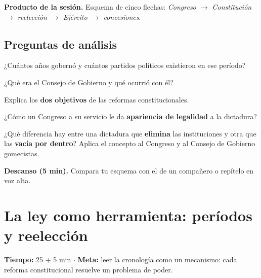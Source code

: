 \documentclass[12pt, letterpaper]{article}
\makeatletter
\let\mw@oldsection\section
\newcommand{\mw@prepage}{%
  \par
  \ifdim\pagegoal=\maxdimen\else
    \ifdim\dimexpr\pagegoal-\pagetotal\relax<7cm\relax
      \newpage
    \fi
  \fi}
\renewcommand{\section}{\mw@prepage\mw@oldsection}
\newcommand{\metasesion}[2]{%
  \begin{cabecerasesion}
    \small
    \textbf{\color{mwprimario}Tiempo:} #1 \quad$\cdot$\quad
    \textbf{\color{mwprimario}Meta:} #2
  \end{cabecerasesion}%
}
\newcommand{\pausa}[1]{%
  \begin{descanso}
    \small\textbf{\color{mwnaranja}Descanso (5 min).} #1
  \end{descanso}%
}
\makeatother
\begin{document}
\begin{cuadropasos}
  \small
  \textbf{Producto de la sesión.} Esquema de cinco flechas:
  \textit{Congreso $\rightarrow$ Constitución $\rightarrow$ reelección
  $\rightarrow$ Ejército $\rightarrow$ concesiones}.
\end{cuadropasos}

\subsection*{Preguntas de análisis}
\begin{preguntas}
  \item \facil{} ¿Cuántos años gobernó y cuántos partidos políticos existieron en
        ese período?
  \item \facil{} ¿Qué era el Consejo de Gobierno y qué ocurrió con él?
  \item \medio{} Explica los \textbf{dos objetivos} de las reformas
        constitucionales.
  \item \dificil{} ¿Cómo un Congreso \guillemotleft a su servicio\guillemotright{}
        le da \textbf{apariencia de legalidad} a la dictadura?
  \item \muyDificil{} ¿Qué diferencia hay entre una dictadura que
        \textbf{elimina} las instituciones y otra que las \textbf{vacía por
        dentro}? Aplica el concepto al Congreso y al Consejo de Gobierno
        gomecistas.
\end{preguntas}

\pausa{Compara tu esquema con el de un compañero o repítelo en voz alta.}

\section{La ley como herramienta: períodos y reelección}

\metasesion{25 + 5 min}{leer la cronología como un mecanismo: cada reforma
constitucional resuelve un problema de poder.}
\end{document}
